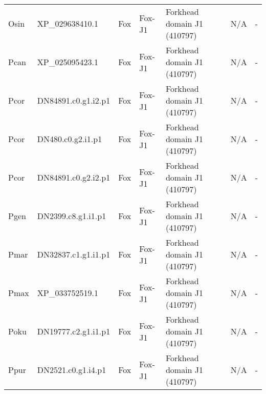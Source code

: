 \documentclass[../main.tex]{subfiles}
\begin{document}
\begin{landscape}
\begin{longtable}{lllllll}
		Osin           & XP\_029638410.1       & Fox            & Fox-J1              & Forkhead domain J1 (410797)                 & N/A                                                                    & -                    \\
		Pcan           & XP\_025095423.1       & Fox            & Fox-J1              & Forkhead domain J1 (410797)                 & N/A                                                                    & -                    \\
		Pcor           & DN84891.c0.g1.i2.p1   & Fox            & Fox-J1              & Forkhead domain J1 (410797)                 & N/A                                                                    & -                    \\
		Pcor           & DN480.c0.g2.i1.p1     & Fox            & Fox-J1              & Forkhead domain J1 (410797)                 & N/A                                                                    & -                    \\
		Pcor           & DN84891.c0.g2.i2.p1   & Fox            & Fox-J1              & Forkhead domain J1 (410797)                 & N/A                                                                    & -                    \\
		Pgen           & DN2399.c8.g1.i1.p1    & Fox            & Fox-J1              & Forkhead domain J1 (410797)                 & N/A                                                                    & -                    \\
		Pmar           & DN32837.c1.g1.i1.p1   & Fox            & Fox-J1              & Forkhead domain J1 (410797)                 & N/A                                                                    & -                    \\
		Pmax           & XP\_033752519.1       & Fox            & Fox-J1              & Forkhead domain J1 (410797)                 & N/A                                                                    & -                    \\
		Poku           & DN19777.c2.g1.i1.p1   & Fox            & Fox-J1              & Forkhead domain J1 (410797)                 & N/A                                                                    & -                    \\
		Ppur           & DN2521.c0.g1.i4.p1    & Fox            & Fox-J1              & Forkhead domain J1 (410797)                 & N/A                                                                    & -                    \\

\end{longtable}
\end{landscape}
\end{document}
